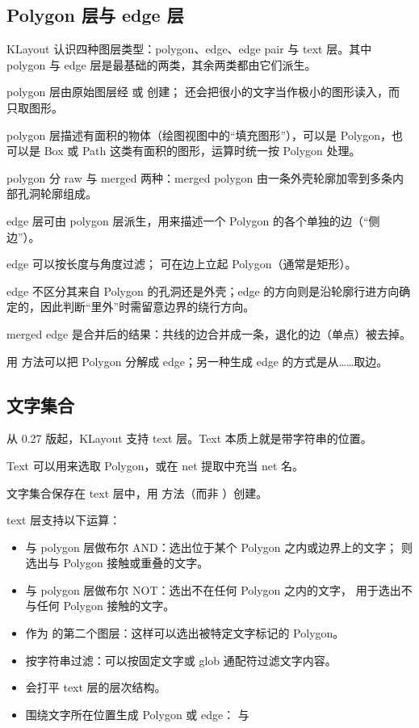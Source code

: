 \subsection{Polygon 层与 edge 层}

KLayout 认识四种图层类型：polygon、edge、edge pair 与 text 层。其中 polygon 与 edge 层是最基础的两类，其余两类都由它们派生。

polygon 层由原始图层经  或  创建； 还会把很小的文字当作极小的图形读入，而  只取图形。

polygon 层描述有面积的物体（绘图视图中的“填充图形”），可以是 Polygon，也可以是 Box 或 Path 这类有面积的图形，运算时统一按 Polygon 处理。

polygon 分 raw 与 merged 两种：merged polygon 由一条外壳轮廓加零到多条内部孔洞轮廓组成。

edge 层可由 polygon 层派生，用来描述一个 Polygon 的各个单独的边（“侧边”）。

edge 可以按长度与角度过滤； 可在边上立起 Polygon（通常是矩形）。

edge 不区分其来自 Polygon 的孔洞还是外壳；edge 的方向则是沿轮廓行进方向确定的，因此判断“里外”时需留意边界的绕行方向。

merged edge 是合并后的结果：共线的边合并成一条，退化的边（单点）被去掉。

用  方法可以把 Polygon 分解成 edge；另一种生成 edge 的方式是从……取边。

\subsection{文字集合}

从 0.27 版起，KLayout 支持 text 层。Text 本质上就是带字符串的位置。

Text 可以用来选取 Polygon，或在 net 提取中充当 net 名。

文字集合保存在 text 层中，用  方法（而非 ）创建。

text 层支持以下运算：

\begin{itemize}
\item 与 polygon 层做布尔 AND：选出位于某个 Polygon 之内或边界上的文字； 则选出与 Polygon 接触或重叠的文字。
\item 与 polygon 层做布尔 NOT：选出不在任何 Polygon 之内的文字， 用于选出不与任何 Polygon 接触的文字。
\item 作为  的第二个图层：这样可以选出被特定文字标记的 Polygon。
\item 按字符串过滤：可以按固定文字或 glob 通配符过滤文字内容。
\item {} 会打平 text 层的层次结构。
\item 围绕文字所在位置生成 Polygon 或 edge： 与 
\end{itemize}

